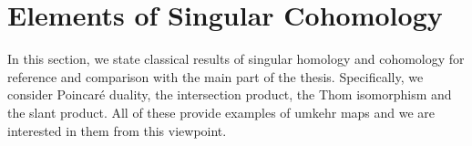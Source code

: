 \documentclass{scrartcl}
\theoremstyle{plain}
\newtheorem{theorem}{Theorem}[section]
\theoremstyle{definition}
\newcommand{\APL}{A_{PL}}
\DeclareMathOperator{\cConf}{\overline{Conf}}
\DeclareMathOperator{\coGraphs}{{}^*Graphs}
\begin{document}





\newpage
\appendix





\section{Elements of Singular Cohomology}

In this section, we state classical results of singular homology and cohomology for reference and comparison with the main part of the thesis. Specifically, we consider Poincaré duality, the intersection product, the Thom isomorphism and the slant product. All of these provide examples of umkehr maps and we are interested in them from this viewpoint. 
\end{document}
